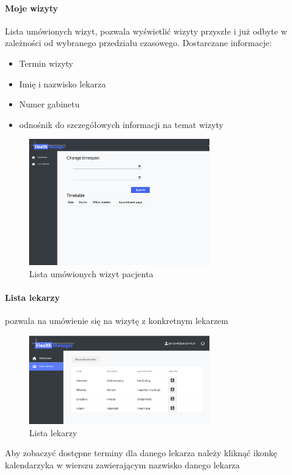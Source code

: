\documentclass[polish,12pt]{aghthesis}
\begin{document}
    \paragraph{Moje wizyty}{Lista umówionych wizyt, pozwala wyświetlić wizyty przyszłe i już odbyte w zależności od wybranego przedziału czasowego. Dostarczane informacje:
    \begin{itemize}
        \item Termin wizyty
        \item Imię i nazwisko lekarza
        \item Numer gabinetu
        \item odnośnik do szczegółowych informacji na temat wizyty
    \end{itemize}
        \begin{figure}[H]
        \includegraphics[width=0.7\textwidth]{gui-patient-my-visits}
        \caption{Lista umówionych wizyt pacjenta}
    \end{figure}    
    }
    \paragraph{Lista lekarzy} pozwala na umówienie się na wizytę z konkretnym lekarzem
    \begin{figure}[H]
        \includegraphics[width=0.7\textwidth]{gui-doctor-list}
        \caption{Lista lekarzy}
    \end{figure}
    Aby zobaczyć dostępne terminy dla danego lekarza należy kliknąć ikonkę kalendarzyka w wierszu zawierającym nazwisko danego lekarza
\end{document}
